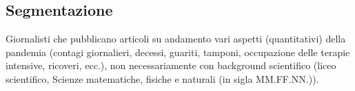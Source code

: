 \subsection{Segmentazione}
Giornalisti che pubblicano articoli su andamento vari aspetti (quantitativi) della pandemia (contagi giornalieri, decessi, guariti, tamponi, occupazione delle terapie intensive, ricoveri, ecc.), non necessariamente con background scientifico (liceo scientifico, Scienze matematiche, fisiche e naturali (in sigla MM.FF.NN.)).